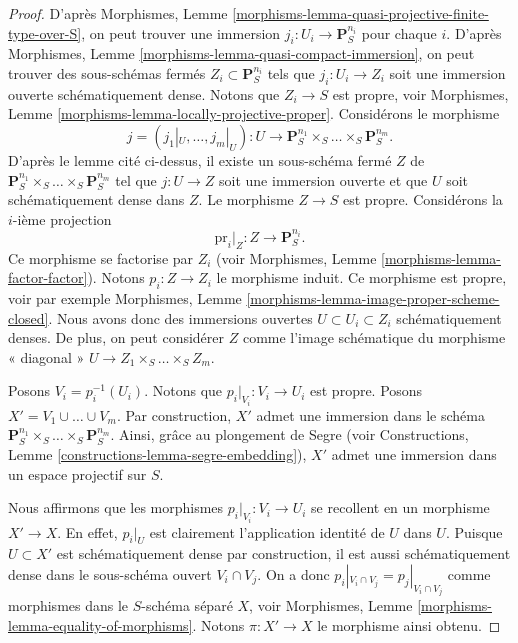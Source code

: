 \begin{proof}
\medskip\noindent
D'après Morphismes, Lemme \ref{morphisms-lemma-quasi-projective-finite-type-over-S},
on peut trouver une immersion $j_i : U_i \to \mathbf{P}_S^{n_i}$
pour chaque $i$. D'après
Morphismes, Lemme \ref{morphisms-lemma-quasi-compact-immersion}, on peut trouver
des sous-schémas fermés $Z_i \subset \mathbf{P}_S^{n_i}$
tels que $j_i : U_i \to Z_i$ soit une immersion ouverte
schématiquement dense. Notons que $Z_i \to S$ est propre, voir
Morphismes, Lemme \ref{morphisms-lemma-locally-projective-proper}.
Considérons le morphisme
$$
j = (j_1|_U, \ldots, j_m|_U) : U \longrightarrow
\mathbf{P}_S^{n_1} \times_S \ldots \times_S \mathbf{P}_S^{n_m}.
$$
D'après le lemme cité ci-dessus, il existe un sous-schéma fermé
$Z$ de $\mathbf{P}_S^{n_1} \times_S \ldots \times_S \mathbf{P}_S^{n_m}$
tel que $j : U \to Z$ soit une immersion ouverte et que $U$
soit schématiquement dense dans $Z$. Le morphisme $Z \to S$
est propre. Considérons la $i$-ième projection
$$
\text{pr}_i|_Z : Z \longrightarrow \mathbf{P}^{n_i}_S.
$$
Ce morphisme se factorise par $Z_i$ (voir Morphismes,
Lemme \ref{morphisms-lemma-factor-factor}). Notons $p_i : Z \to Z_i$
le morphisme induit. Ce morphisme est propre, voir par exemple
Morphismes, Lemme \ref{morphisms-lemma-image-proper-scheme-closed}.
Nous avons donc des immersions ouvertes
$U \subset U_i \subset Z_i$ schématiquement
denses. De plus, on peut considérer $Z$ comme
l'image schématique du morphisme « diagonal »
$U \to Z_1 \times_S \ldots \times_S Z_m$.

\medskip\noindent
Posons $V_i = p_i^{-1}(U_i)$. Notons que $p_i|_{V_i} : V_i \to U_i$ est propre.
Posons $X' = V_1 \cup \ldots \cup V_m$. Par construction, $X'$ admet une immersion
dans le schéma
$\mathbf{P}^{n_1}_S \times_S \ldots \times_S \mathbf{P}^{n_m}_S$.
Ainsi, grâce au plongement de Segre (voir
Constructions, Lemme \ref{constructions-lemma-segre-embedding}),
$X'$ admet
une immersion dans un espace projectif sur $S$.

\medskip\noindent
Nous affirmons que les morphismes $p_i|_{V_i}: V_i \to U_i$ se recollent en un morphisme
$X' \to X$. En effet, $p_i|_U$ est clairement l'application identité
de $U$ dans $U$. Puisque $U \subset X'$ est schématiquement
dense par construction, il est aussi schématiquement dense
dans le sous-schéma ouvert $V_i \cap V_j$. On a donc
$p_i|_{V_i \cap V_j} = p_j|_{V_i \cap V_j}$ comme morphismes dans le
$S$-schéma séparé $X$, voir
Morphismes, Lemme \ref{morphisms-lemma-equality-of-morphisms}.
Notons $\pi : X' \to X$ le morphisme ainsi obtenu.


\end{proof}
